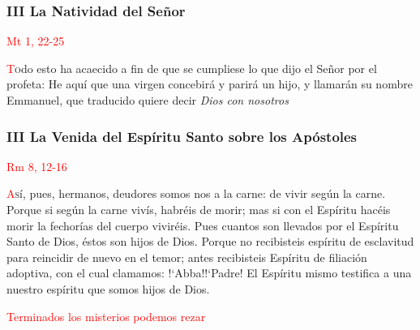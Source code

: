 \documentclass[10pt,twoside]{book}
\begin{document}
\begin{paracol}{2}
      \begin{leftcolumn}
            \noindent\subsubsection*{III La Natividad del Señor}

            \vspace{-0.5em}

            \hfill\textcolor{red}{Mt 1, 22-25}

            \lettrine[lines=2]{\textcolor{red}{T}}odo esto ha acaecido a fin de que se cumpliese lo que dijo el Señor por el profeta: He aquí que una virgen concebirá y parirá
            un hijo, y llamarán su nombre Emmanuel, que traducido quiere decir \textit{Dios con nosotros}
      \end{leftcolumn}
      \begin{rightcolumn}
            \noindent\subsubsection*{III La Venida del Espíritu Santo sobre los Apóstoles}

            \vspace{-0.5em}

            \hfill\textcolor{red}{Rm 8, 12-16}

            \lettrine[lines=2]{\textcolor{red}{A}}sí, pues, hermanos, deudores somos nos a la carne: de vivir según la carne. Porque si según la carne vivís, habréis de morir; mas
            si con el Espíritu hacéis morir la fechorías del cuerpo viviréis. Pues cuantos son llevados por el Espíritu Santo de Dios, éstos son hijos de Dios. Porque no recibisteis
            espíritu de esclavitud para reincidir de nuevo en el temor; antes recibisteis Espíritu de filiación adoptiva, con el cual clamamos: {!`}Abba!{!`}Padre! El Espíritu mismo
            testifica a una nuestro espíritu que somos hijos de Dios.
      \end{rightcolumn}
\end{paracol}

\label{final-prayer}
\begin{center}
      \textcolor{red}{Terminados los misterios podemos rezar}
\end{center}
\end{document}
